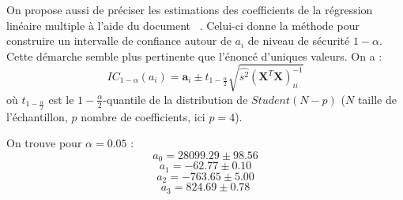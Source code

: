 \documentclass{book}
\begin{document}
\bigbreak
\bigbreak
\bigbreak
On propose aussi de préciser les estimations des coefficients de la régression linéaire multiple à l'aide du document ~\cite{ref3}. Celui-ci donne la méthode pour construire un intervalle de confiance autour de $a_i$ de niveau de sécurité $1-\alpha$. Cette démarche semble plus pertinente que l'énoncé d'uniques valeurs. On a :
\[IC_{1-\alpha}(a_i)=\textbf{a}_i\pm t_{1-\frac{\alpha}{2}}\sqrt{\hat{s^2}(\textbf{X}^{T}\textbf{X})^{-1}_{ii}}\]
où $t_{1-\frac{\alpha}{2}}$ est le $1-\frac{\alpha}{2}$-quantile de la distribution de $Student(N-p)$ ($N$ taille de l'échantillon, $p$ nombre de coefficients, ici $p=4$).

On trouve pour $\alpha=0.05$ :
\[a_0=28099.29\pm 98.56\]
\[a_1=-62.77\pm 0.10\]
\[a_2=-763.65\pm 5.00\]
\[a_3= 824.69\pm  0.78\]




\end{document}
